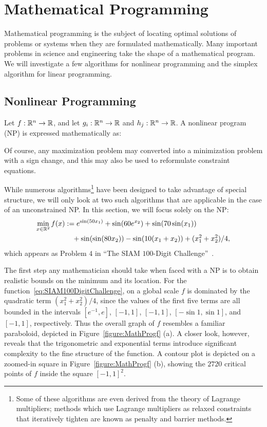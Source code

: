 \chapter{Mathematical Programming}\label{chapter:MathematicalProgramming}

Mathematical programming is the subject of locating optimal solutions of problems or systems when they are formulated mathematically. Many important problems in science and engineering take the shape of a mathematical program. We will investigate a few algorithms for nonlinear programming and the simplex algorithm for linear programming.

\section{Nonlinear Programming}

Let $f:\mathbb{R}^n\to\mathbb{R}$, and let $g_i:\mathbb{R}^n\to\mathbb{R}$ and $h_j:\mathbb{R}^n\to\mathbb{R}$. A nonlinear program (NP) is expressed mathematically as:

Of course, any maximization problem may converted into a minimization problem with a sign change, and this may also be used to reformulate constraint equations.

While numerous algorithms\footnote{Some of these algorithms are even derived from the theory of Lagrange multipliers; methods which use Lagrange multipliers as relaxed constraints that iteratively tighten are known as penalty and barrier methods.} have been designed to take advantage of special structure, we will only look at two such algorithms that are applicable in the case of an unconstrained NP. In this section, we will focus solely on the NP:
\begin{align}
\min_{x\in\mathbb{R}^2} f(x) & := e^{\sin(50x_1)} + \sin(60e^{x_2}) + \sin(70\sin(x_1))\nonumber\\
&\quad + \sin(\sin(80x_2)) - \sin(10(x_1+x_2)) + (x_1^2 + x_2^2)/4,\label{eq:SIAM100DigitChallenge}
\end{align}
which appears as Problem $4$ in ``The SIAM $100$-Digit Challenge''~\cite{Bornemann-Laurie-Wagon-Waldvogel-04}.

The first step any mathematician should take when faced with a NP is to obtain realistic bounds on the minimum and its location. For the function~\eqref{eq:SIAM100DigitChallenge}, on a global scale $f$ is dominated by the quadratic term $(x_1^2+x_2^2)/4$, since the values of the first five terms are all bounded in the intervals $[e^{-1},e]$, $[-1,1]$, $[-1,1]$, $[-\sin1,\sin1]$, and $[-1,1]$, respectively. Thus the overall graph of $f$ resembles a familiar paraboloid, depicted in Figure~\ref{figure:MathProgf} (a). A closer look, however, reveals that the trigonometric and exponential terms introduce significant complexity to the fine structure of the function. A contour plot is depicted on a zoomed-in square in Figure~\ref{figure:MathProgf} (b), showing the $2720$ critical points of $f$ inside the square $[-1,1]^2$.

